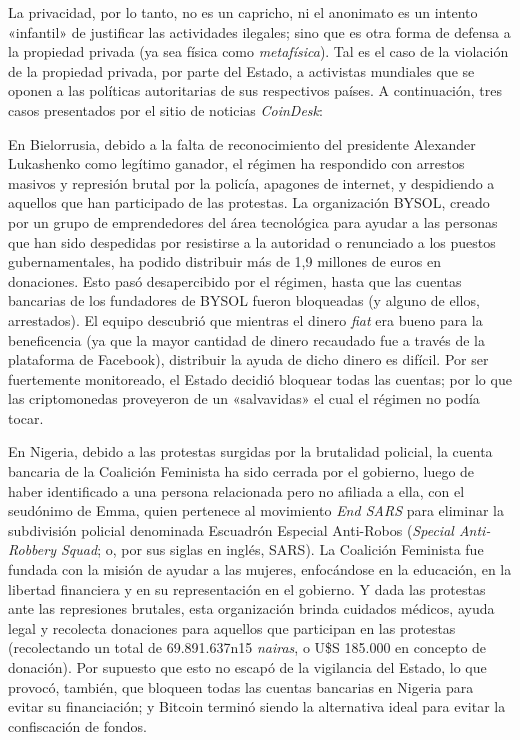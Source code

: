 \documentclass[12pt,a4paper,twoside]{book}
\begin{document}
La privacidad, por lo tanto, no es un capricho, ni el anonimato es un intento «infantil» de justificar las actividades ilegales; sino que es otra forma de defensa a la propiedad privada (ya sea física como \textit{metafísica}). Tal es el caso de la violación de la propiedad privada, por parte del Estado, a activistas mundiales que se oponen a las políticas autoritarias de sus respectivos países. A continuación, tres casos presentados por el sitio de noticias \textit{CoinDesk}:

En Bielorrusia, debido a la falta de reconocimiento del presidente Alexander Lukashenko como legítimo ganador, el régimen ha respondido con arrestos masivos y represión brutal por la policía, apagones de internet, y despidiendo a aquellos que han participado de las protestas. La organización BYSOL, creado por un grupo de emprendedores del área tecnológica para ayudar a las personas que han sido despedidas por resistirse a la autoridad o renunciado a los puestos gubernamentales, ha podido distribuir más de 1,9 millones de euros en donaciones. Esto pasó desapercibido por el régimen, hasta que las cuentas bancarias de los fundadores de BYSOL fueron bloqueadas (y alguno de ellos, arrestados). El equipo descubrió que mientras el dinero \textit{fiat} era bueno para la beneficencia (ya que la mayor cantidad de dinero recaudado fue a través de la plataforma de Facebook), distribuir la ayuda de dicho dinero es difícil. Por ser fuertemente monitoreado, el Estado decidió bloquear todas las cuentas; por lo que las criptomonedas proveyeron de un «salvavidas» el cual el régimen no podía tocar. \cite{bitcoin:bielorrusia}

En Nigeria, debido a las protestas surgidas por la brutalidad policial, la cuenta bancaria de la Coalición Feminista ha sido cerrada por el gobierno, luego de haber identificado a una persona relacionada pero no afiliada a ella, con el seudónimo de Emma, quien pertenece al movimiento \textit{End SARS} para eliminar la subdivisión policial denominada Escuadrón Especial Anti-Robos (\textit{Special Anti-Robbery Squad}; o, por sus siglas en inglés, SARS). La Coalición Feminista fue fundada con la misión de ayudar a las mujeres, enfocándose en la educación, en la libertad financiera y en su representación en el gobierno. Y dada las protestas ante las represiones brutales, esta organización brinda cuidados médicos, ayuda legal y recolecta donaciones para aquellos que participan en las protestas (recolectando un total de 69.891.637n15 \textit{nairas}, o U\$S 185.000 en concepto de donación). Por supuesto que esto no escapó de la vigilancia del Estado, lo que provocó, también, que bloqueen todas las cuentas bancarias en Nigeria para evitar su financiación; y Bitcoin terminó siendo la alternativa ideal para evitar la confiscación de fondos. \cite{bitcoin:nigeria}
\end{document}
